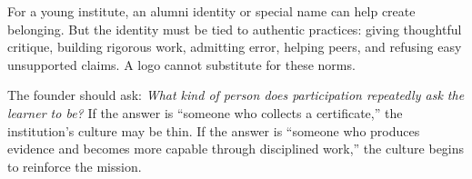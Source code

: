 For a young institute, an alumni identity or special name can help create belonging. But the identity must be tied to authentic practices: giving thoughtful critique, building rigorous work, admitting error, helping peers, and refusing easy unsupported claims. A logo cannot substitute for these norms.

The founder should ask: \emph{What kind of person does participation repeatedly ask the learner to be?} If the answer is ``someone who collects a certificate,'' the institution's culture may be thin. If the answer is ``someone who produces evidence and becomes more capable through disciplined work,'' the culture begins to reinforce the mission.
